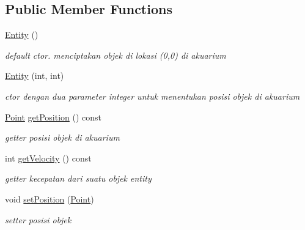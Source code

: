 \subsection*{Public Member Functions}
\begin{DoxyCompactItemize}
\item 
\mbox{\label{classEntity_a980f368aa07ce358583982821533a54a}} 
\hyperlink{classEntity_a980f368aa07ce358583982821533a54a}{Entity} ()
\begin{DoxyCompactList}\small\item\em default ctor. menciptakan objek di lokasi (0,0) di akuarium \end{DoxyCompactList}\item 
\mbox{\label{classEntity_a1dba4ae4a996838f4c0ba1e86a41c181}} 
\hyperlink{classEntity_a1dba4ae4a996838f4c0ba1e86a41c181}{Entity} (int, int)
\begin{DoxyCompactList}\small\item\em ctor dengan dua parameter integer untuk menentukan posisi objek di akuarium \end{DoxyCompactList}\item 
\mbox{\label{classEntity_a0db2ab8dd08e0da409133786803bd4e0}} 
\hyperlink{classPoint}{Point} \hyperlink{classEntity_a0db2ab8dd08e0da409133786803bd4e0}{get\+Position} () const
\begin{DoxyCompactList}\small\item\em getter posisi objek di akuarium \end{DoxyCompactList}\item 
\mbox{\label{classEntity_ac8e667975506fcad1d4d3f0715c4df51}} 
int \hyperlink{classEntity_ac8e667975506fcad1d4d3f0715c4df51}{get\+Velocity} () const
\begin{DoxyCompactList}\small\item\em getter kecepatan dari suatu objek entity \end{DoxyCompactList}\item 
\mbox{\label{classEntity_a1b9a6d2e14faa42afeea2b57218285fd}} 
void \hyperlink{classEntity_a1b9a6d2e14faa42afeea2b57218285fd}{set\+Position} (\hyperlink{classPoint}{Point})
\begin{DoxyCompactList}\small\item\em setter posisi objek \end{DoxyCompactList}\item 

\end{DoxyCompactItemize}

